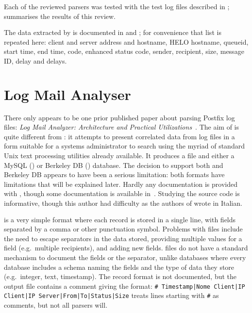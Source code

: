 Each of the reviewed parsers was tested with the \numberOFlogFILES{} test
log files described in ;  summarises the results of this review.

The data extracted by \parsername{} is documented in
 and ; for
convenience that list is repeated here: client and server 
address and hostname, HELO hostname, queueid, start time, end time,
 code, enhanced status code, sender, recipient, size, message
ID, delay and delays.

\section{Log Mail Analyser}

\label{prior art}

There only appears to be one prior published paper about parsing Postfix
log files: \textit{Log Mail Analyzer: Architecture and Practical
Utilizations\/}~\cite{log-mail-analyser}.  The aim of  is
quite different from \parsername{}: it attempts to present correlated data
from log files in a form suitable for a systems administrator to search
using the myriad of standard Unix text processing utilities already
available.  It produces a  file and either a MySQL
() or Berkeley DB
()
database.  The decision to support both  and Berkeley DB
appears to have been a serious limitation: both formats have limitations
that will be explained later.  Hardly any documentation is provided with
, though some documentation is available
in~\cite{log-mail-analyser}.  Studying the source code is informative,
though this author had difficulty as the authors of  wrote in
Italian.

 is a very simple format where each record is stored in a
single line, with fields separated by a comma or other punctuation symbol.
Problems with  files include the need to escape separators in
the data stored, providing multiple values for a field (e.g.\ multiple
recipients), and adding new fields.   files do not have a
standard mechanism to document the fields or the separator, unlike
 databases where every database includes a schema naming the
fields and the type of data they store (e.g.\ integer, text, timestamp).
The  record format is not documented, but the output file
contains a comment giving the format:\newline{} \texttt{\# Timestamp|Nome
Client|IP Client|IP Server|From|To|Status|Size} \newline{}
treats  lines starting with \texttt{\#} as comments, but not
all  parsers will.

